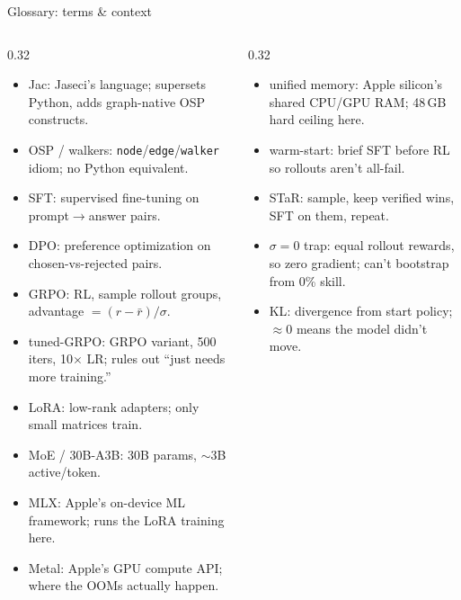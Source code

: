 \documentclass[aspectratio=169,10pt]{beamer}
\newcommand{\term}[1]{\textcolor{jasecidark}{#1}}
\begin{document}
\begin{frame}[t]{Glossary: terms \& context}
  \tiny
  \begin{columns}[T]
    \begin{column}{0.32\textwidth}
      \begin{itemize}\itemsep0.15em
        \item \term{Jac}: Jaseci's language; supersets Python, adds graph-native OSP constructs.
        \item \term{OSP / walkers}: \texttt{node}/\texttt{edge}/\texttt{walker} idiom; no Python equivalent.
        \item \term{SFT}: supervised fine-tuning on prompt$\rightarrow$answer pairs.
        \item \term{DPO}: preference optimization on chosen-vs-rejected pairs.
        \item \term{GRPO}: RL, sample rollout groups, advantage $=(r-\bar r)/\sigma$.
        \item \term{tuned-GRPO}: GRPO variant, 500 iters, 10$\times$ LR; rules out ``just needs more training.''
        \item \term{LoRA}: low-rank adapters; only small matrices train.
        \item \term{MoE / 30B-A3B}: 30B params, $\sim$3B active/token.
        \item \term{MLX}: Apple's on-device ML framework; runs the LoRA training here.
        \item \term{Metal}: Apple's GPU compute API; where the OOMs actually happen.
      \end{itemize}
    \end{column}
    \begin{column}{0.32\textwidth}
      \begin{itemize}\itemsep0.15em
        \item \term{unified memory}: Apple silicon's shared CPU/GPU RAM; 48\,GB hard ceiling here.
        \item \term{warm-start}: brief SFT before RL so rollouts aren't all-fail.
        \item \term{STaR}: sample, keep verified wins, SFT on them, repeat.
        \item \term{$\sigma=0$ trap}: equal rollout rewards, so zero gradient; can't bootstrap from 0\% skill.
        \item \term{KL}: divergence from start policy; $\approx$0 means the model didn't move.

\end{itemize}
\end{column}
\end{columns}
\end{frame}
\end{document}
